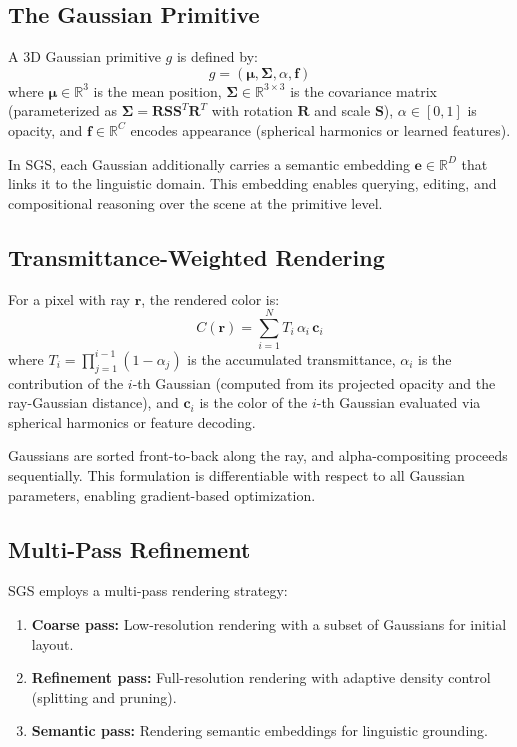 \documentclass[11pt]{article}
\begin{document}
\subsection{The Gaussian Primitive}

A 3D Gaussian primitive $g$ is defined by:
\begin{equation}
g = (\boldsymbol{\mu}, \boldsymbol{\Sigma}, \alpha, \mathbf{f})
\end{equation}
where $\boldsymbol{\mu} \in \mathbb{R}^3$ is the mean position, $\boldsymbol{\Sigma} \in \mathbb{R}^{3 \times 3}$ is the covariance matrix (parameterized as $\boldsymbol{\Sigma} = \mathbf{R}\mathbf{S}\mathbf{S}^T\mathbf{R}^T$ with rotation $\mathbf{R}$ and scale $\mathbf{S}$), $\alpha \in [0,1]$ is opacity, and $\mathbf{f} \in \mathbb{R}^C$ encodes appearance (spherical harmonics or learned features).

In SGS, each Gaussian additionally carries a semantic embedding $\mathbf{e} \in \mathbb{R}^D$ that links it to the linguistic domain. This embedding enables querying, editing, and compositional reasoning over the scene at the primitive level.

\subsection{Transmittance-Weighted Rendering}

For a pixel with ray $\mathbf{r}$, the rendered color is:
\begin{equation}
C(\mathbf{r}) = \sum_{i=1}^{N} T_i \, \alpha_i \, \mathbf{c}_i
\end{equation}
where $T_i = \prod_{j=1}^{i-1}(1 - \alpha_j)$ is the accumulated transmittance, $\alpha_i$ is the contribution of the $i$-th Gaussian (computed from its projected opacity and the ray-Gaussian distance), and $\mathbf{c}_i$ is the color of the $i$-th Gaussian evaluated via spherical harmonics or feature decoding.

Gaussians are sorted front-to-back along the ray, and alpha-compositing proceeds sequentially. This formulation is differentiable with respect to all Gaussian parameters, enabling gradient-based optimization.

\subsection{Multi-Pass Refinement}

SGS employs a multi-pass rendering strategy:

\begin{enumerate}
    \item \textbf{Coarse pass:} Low-resolution rendering with a subset of Gaussians for initial layout.
    \item \textbf{Refinement pass:} Full-resolution rendering with adaptive density control (splitting and pruning).
    \item \textbf{Semantic pass:} Rendering semantic embeddings for linguistic grounding.
\end{enumerate}
\end{document}
